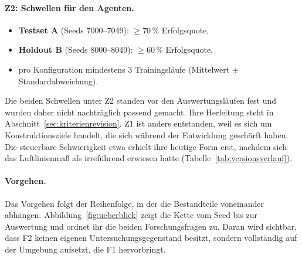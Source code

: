 \documentclass[11pt,a4paper]{article}
\begin{document}
\paragraph{Z2: Schwellen für den Agenten.}

\begin{itemize}
  \item \textbf{Testset A} (Seeds 7000--7049): $\geq 70\,\%$ Erfolgsquote,
  \item \textbf{Holdout B} (Seeds 8000--8049): $\geq 60\,\%$ Erfolgsquote,
  \item pro Konfiguration mindestens 3 Trainingsläufe (Mittelwert $\pm$ Standardabweichung).
\end{itemize}

\noindent
Die beiden Schwellen unter Z2 standen vor den Auswertungsläufen fest und wurden
daher nicht nachträglich passend gemacht. Ihre Herleitung steht in
Abschnitt~\ref{sec:kriterienrevision}. Z1 ist anders entstanden, weil es sich
um Konstruktionsziele handelt, die sich während der Entwicklung geschärft
haben. Die steuerbare Schwierigkeit etwa erhielt ihre heutige Form erst,
nachdem sich das Luftlinienmaß als irreführend erwiesen hatte
(Tabelle~\ref{tab:versionsverlauf}).

\paragraph{Vorgehen.}
Das Vorgehen folgt der Reihenfolge, in der die Bestandteile voneinander
abhängen. Abbildung~\ref{fig:ueberblick} zeigt die Kette vom Seed bis zur
Auswertung und ordnet ihr die beiden Forschungsfragen zu. Daran wird sichtbar,
dass F2 keinen eigenen Untersuchungsgegenstand besitzt, sondern vollständig auf
der Umgebung aufsetzt, die F1 hervorbringt.
\end{document}
